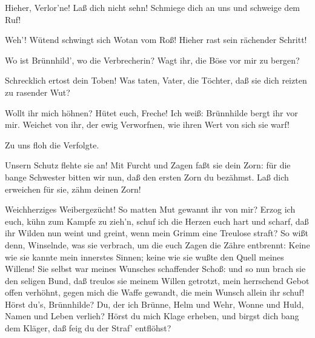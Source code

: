 \begin{drama}
Hieher, Verlor'ne! Laß dich nicht sehn!
Schmiege dich an uns und schweige dem Ruf!
 



Weh'! Wütend schwingt sich Wotan vom Roß!
Hieher rast sein rächender Schritt!

\scene



\Wotanspeaks
Wo ist Brünnhild', wo die Verbrecherin?
Wagt ihr, die Böse vor mir zu bergen?

Schrecklich ertost dein Toben!
Was taten, Vater, die Töchter,
daß sie dich reizten zu rasender Wut?
 

\Wotanspeaks
Wollt ihr mich höhnen? Hütet euch, Freche!
Ich weiß: Brünnhilde bergt ihr vor mir.
Weichet von ihr, der ewig Verworfnen,
wie ihren Wert von sich sie warf!
 

\Rossweissespeaks
Zu uns floh die Verfolgte.
 

Unsern Schutz flehte sie an!
Mit Furcht und Zagen faßt sie dein Zorn:
für die bange Schwester bitten wir nun,
daß den ersten Zorn du bezähmst.
Laß dich erweichen für sie, zähm deinen Zorn!
 

\Wotanspeaks
Weichherziges Weibergezücht!
So matten Mut gewannt ihr von mir?
Erzog ich euch, kühn zum Kampfe zu zieh'n,
schuf ich die Herzen
euch hart und scharf,
daß ihr Wilden nun weint und greint,
wenn mein Grimm eine Treulose straft?
So wißt denn, Winselnde, was sie verbrach,
um die euch Zagen die Zähre entbrennt:
Keine wie sie
kannte mein innerstes Sinnen;
keine wie sie
wußte den Quell meines Willens!
Sie selbst war
meines Wunsches schaffender Schoß:
und so nun brach sie den seligen Bund,
daß treulos sie meinem Willen getrotzt,
mein herrschend Gebot offen verhöhnt,
gegen mich die Waffe gewandt,
die mein Wunsch allein ihr schuf!
Hörst du's, Brünnhilde? Du, der ich Brünne,
Helm und Wehr, Wonne und Huld,
Namen und Leben verlieh?
Hörst du mich Klage erheben,
und birgst dich bang dem Kläger,
daß feig du der Straf' entflöhst?
 

\Brunnhildespeaks



\end{drama}
